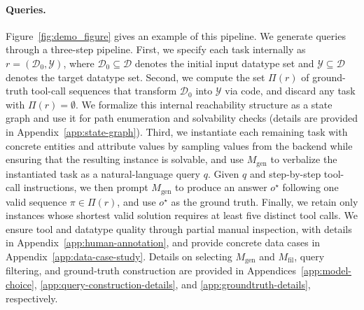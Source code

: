 \documentclass{llmxive}
\begin{document}
\paragraph{Queries.}
Figure~\ref{fig:demo_figure} gives an example of this pipeline.
We generate queries through a three-step pipeline.
First, we specify each task internally as $r=(\mathcal{D}_0, \mathcal{Y})$, where $\mathcal{D}_0 \subseteq \mathcal{D}$ denotes the initial input datatype set and $\mathcal{Y} \subseteq \mathcal{D}$ denotes the target datatype set.
Second, we compute the set $\Pi(r)$ of ground-truth tool-call sequences that transform $\mathcal{D}_0$ into $\mathcal{Y}$ via code, and discard any task with $\Pi(r)=\emptyset$.
We formalize this internal reachability structure as a state graph and use it for path enumeration and solvability checks (details are provided in Appendix~\ref{app:state-graph}).
Third, we instantiate each remaining task with concrete entities and attribute values by sampling values from the backend while ensuring that the resulting instance is solvable, and use $M_{\mathrm{gen}}$ to verbalize the instantiated task as a natural-language query $q$.
Given $q$ and step-by-step tool-call instructions, we then prompt $M_{\mathrm{gen}}$ to produce an answer $o^\star$ following one valid sequence $\pi \in \Pi(r)$, and use $o^\star$ as the ground truth.
Finally, we retain only instances whose shortest valid solution requires at least five distinct tool calls.
We ensure tool and datatype quality through partial manual inspection, with details in Appendix~\ref{app:human-annotation}, and provide concrete data cases in Appendix~\ref{app:data-case-study}.
Details on selecting $M_{\mathrm{gen}}$ and $M_{\mathrm{fil}}$, query filtering, and ground-truth construction are provided in Appendices~\ref{app:model-choice}, \ref{app:query-construction-details}, and \ref{app:groundtruth-details}, respectively.




\end{document}

